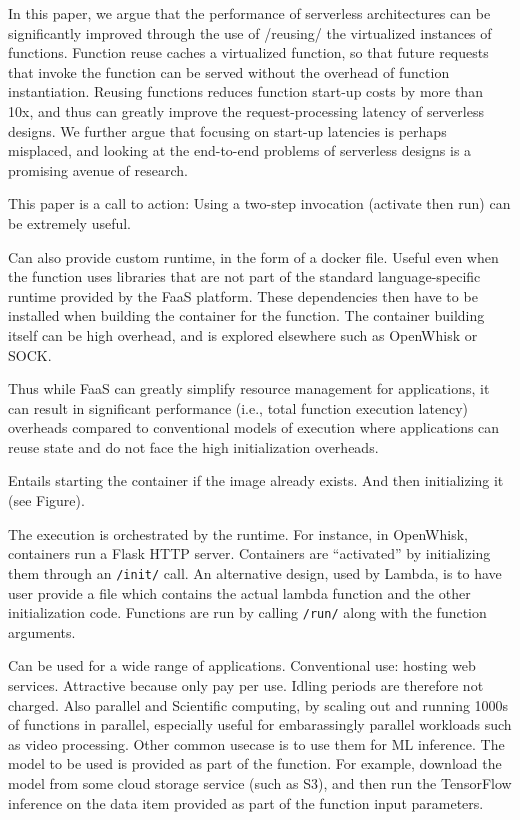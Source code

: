 In this paper, we argue that the performance of serverless architectures can be significantly improved through the use of /reusing/ the virtualized instances of functions. 
Function reuse caches a virtualized function, so that future requests that invoke the function can be served without the overhead of function instantiation. 
Reusing functions reduces function start-up costs by more than 10x, and thus can greatly improve the request-processing latency of serverless designs. 
We further argue that focusing on start-up latencies is perhaps misplaced, and looking at the end-to-end problems of serverless designs is a promising avenue of research. 


This paper is a call to action: Using a two-step invocation (activate then run) can be extremely useful.




Can also provide custom runtime, in the form of a docker file.
Useful even when the function uses libraries that are not part of the standard language-specific runtime provided by the FaaS platform. These dependencies then have to be installed when building the container for the function. The container building itself can be high overhead, and is explored elsewhere such as OpenWhisk or SOCK. 

Thus while FaaS can greatly simplify resource management for applications, it can result in significant performance (i.e., total function execution latency) overheads compared to conventional models of execution where applications can reuse state and do not face the high initialization overheads. 

%
Entails starting the container if the image already exists. 
%
And then initializing it (see Figure).




The execution is orchestrated by the runtime.
%
For instance, in OpenWhisk, containers run a Flask HTTP server.
Containers are ``activated'' by initializing them through an \texttt{/init/} call.
%
An alternative design, used by Lambda, is to have user provide a file which contains the actual lambda function and the other initialization code. 
%
Functions are run by calling \texttt{/run/} along with the function arguments.




Can be used for a wide range of applications.
%
Conventional use: hosting web services. Attractive because only pay per use. Idling periods are therefore not charged.
%
Also parallel and Scientific computing, by scaling out and running 1000s of functions in parallel, especially useful for embarassingly parallel workloads such as video processing.
%
Other common usecase is to use them for ML inference. The model to be used is provided as part of the function.
%
For example, download the model from some cloud storage service (such as S3), and then run the TensorFlow inference on the data item provided as part of the function input parameters. 

